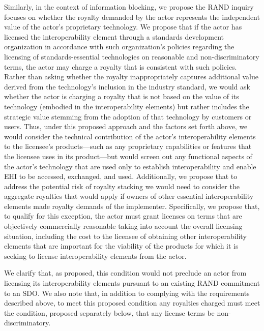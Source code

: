 \documentclass[twoside,11pt]{article}
\begin{document}
          Similarly, in the context of information blocking, we propose the RAND inquiry focuses on whether the royalty demanded by the actor represents the independent value of the actor's proprietary technology. We propose that if the actor has licensed the interoperability element through a standards development organization in accordance with such organization's policies regarding the licensing of standards-essential technologies on reasonable and non-discriminatory terms, the actor may charge a royalty that is consistent with such policies. Rather than asking whether the royalty inappropriately captures additional value derived from the technology's inclusion in the industry standard, we would ask whether the actor is charging a royalty that is not based on the value of its technology (embodied in the interoperability elements) but rather includes the strategic value stemming from the adoption of that technology by customers or users. Thus, under this proposed approach and the factors set forth above, we would consider the technical contribution of the actor's interoperability elements to the licensee's products—such as any proprietary capabilities or features that the licensee uses in its product—but would screen out any functional aspects of the actor's technology that are used only to establish interoperability and enable EHI to be accessed, exchanged, and used. Additionally, we propose that  \ifhmode\expandafter\xspace\fi to address the potential risk of royalty stacking we would need to consider the aggregate royalties that would apply if owners of other essential interoperability elements made royalty demands of the implementer. Specifically, we propose that, to qualify for this exception, the actor must grant licenses on terms that are objectively commercially reasonable taking into account the overall licensing situation, including the cost to the licensee of obtaining other interoperability elements that are important for the viability of the products for which it is seeking to license interoperability elements from the actor.


          We clarify that, as proposed, this condition would not preclude an actor from licensing its interoperability elements pursuant to an existing RAND commitment to an SDO. We also note that, in addition to complying with the requirements described above, to meet this proposed condition any royalties charged must meet the condition, proposed separately below, that any license terms be non-discriminatory.
\end{document}
